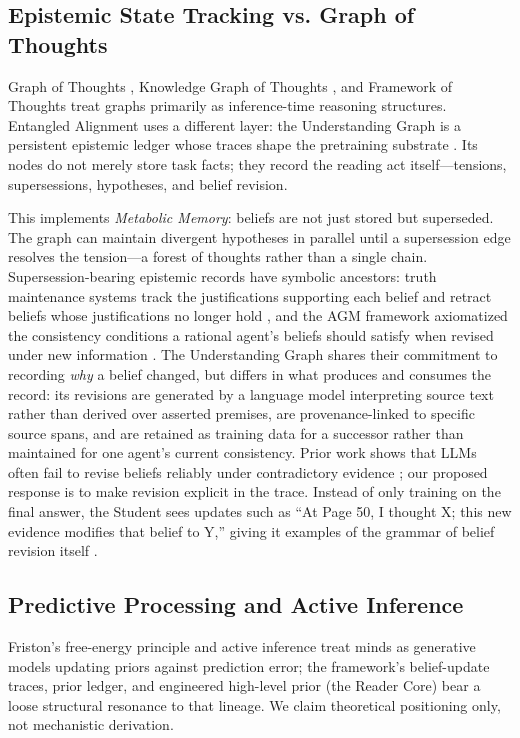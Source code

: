 \subsection{Epistemic State Tracking vs. Graph of Thoughts}

Graph of Thoughts \cite{besta2024graph}, Knowledge Graph of Thoughts
\cite{besta2025kgot}, and Framework of Thoughts \cite{fricke2026fot} treat
graphs primarily as inference-time reasoning structures. Entangled Alignment
uses a different layer: the Understanding Graph is a persistent epistemic
ledger whose traces shape the pretraining substrate
\cite{westerberg2026understanding}. Its nodes do not merely store task facts;
they record the reading act itself---tensions, supersessions, hypotheses, and
belief revision.

This implements \emph{Metabolic Memory}: beliefs are not just stored but
superseded. The graph can maintain divergent hypotheses in parallel until a
supersession edge resolves the tension---a forest of thoughts rather than a
single chain. Supersession-bearing epistemic records have symbolic ancestors:
truth maintenance systems track the justifications supporting each belief and
retract beliefs whose justifications no longer hold \cite{doyle1979tms}, and the
AGM framework axiomatized the consistency conditions a rational agent's beliefs
should satisfy when revised under new information \cite{alchourron1985agm}. The
Understanding Graph shares their commitment to recording \emph{why} a belief
changed, but differs in what produces and consumes the record: its revisions are
generated by a language model interpreting source text rather than derived over
asserted premises, are provenance-linked to specific source spans, and are
retained as training data for a successor rather than maintained for one agent's
current consistency. Prior work shows that LLMs often fail to revise beliefs reliably
under contradictory evidence \cite{xu2024belief}; our proposed response is to
make revision explicit in the trace. Instead of only training on the final
answer, the Student sees updates such as ``At Page 50, I thought X; this new
evidence modifies that belief to Y,'' giving it examples of the grammar of
belief revision itself \cite{didolkar2024metacognitive, xu2024belief}.

\subsection{Predictive Processing and Active Inference}

Friston's free-energy principle and active inference
\cite{friston2010free, parr2019generalised} treat minds as generative models
updating priors against prediction error; the framework's belief-update
traces, prior ledger, and engineered high-level prior (the Reader Core) bear a
loose structural resonance to that lineage. We claim theoretical positioning
only, not mechanistic derivation.

